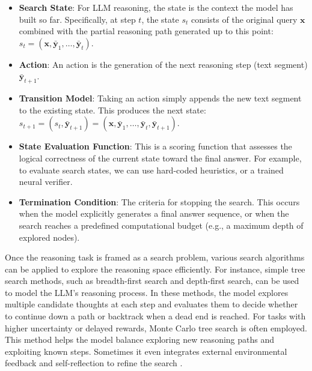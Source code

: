 \begin{itemize}
\item \vspace{0.5em} \textbf{Search State}: For LLM reasoning, the state is the context the model has built so far. Specifically, at step $t$, the state $s_t$ consists of the original query $\mathbf{x}$ combined with the partial reasoning path generated up to this point: $s_t = (\mathbf{x}, \bar{\mathbf{y}}_1, \dots, \bar{\mathbf{y}}_t)$.
\item \vspace{0.3em} \textbf{Action}: An action is the generation of the next reasoning step (text segment) $\bar{\mathbf{y}}_{t+1}$.
\item \vspace{0.3em} \textbf{Transition Model}: Taking an action simply appends the new text segment to the existing state. This produces the next state: $s_{t+1} = (s_t, \bar{\mathbf{y}}_{t+1}) = (\mathbf{x}, \bar{\mathbf{y}}_1, \dots, \bar{\mathbf{y}}_t, \bar{\mathbf{y}}_{t+1})$.
\item \vspace{0.3em} \textbf{State Evaluation Function}: This is a scoring function that assesses the logical correctness of the current state toward the final answer. For example, to evaluate search states, we can use hard-coded heuristics, or a trained neural verifier.
\item \vspace{0.3em} \textbf{Termination Condition}: The criteria for stopping the search. This occurs when the model explicitly generates a final answer sequence, or when the search reaches a predefined computational budget (e.g., a maximum depth of explored nodes).
\end{itemize}
\vspace{0.5em}

Once the reasoning task is framed as a search problem, various search algorithms can be applied to explore the reasoning space efficiently. For instance, simple tree search methods, such as breadth-first search and depth-first search, can be used to model the LLM's reasoning process. In these methods, the model explores multiple candidate thoughts at each step and evaluates them to decide whether to continue down a path or backtrack when a dead end is reached. For tasks with higher uncertainty or delayed rewards, Monte Carlo tree search is often employed. This method helps the model balance exploring new reasoning paths and exploiting known steps. Sometimes it even integrates external environmental feedback and self-reflection to refine the search \cite{yao-etal:2024tree,hao-etal:2023reasoning,zhou-etal:2024language}.

